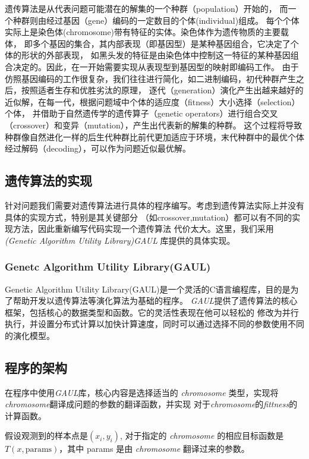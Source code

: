 \documentclass[a4paper]{article}
\begin{document}
遗传算法是从代表问题可能潜在的解集的一个种群（population）开始的，
而一个种群则由经过基因（gene）编码的一定数目的个体(individual)组成。
每个个体实际上是染色体(chromosome)带有特征的实体。染色体作为遗传物质的主要载体，
即多个基因的集合，其内部表现（即基因型）是某种基因组合，它决定了个体的形状的外部表现，
如黑头发的特征是由染色体中控制这一特征的某种基因组合决定的。因此，在一开始需要实现从表现型到基因型的映射即编码工作。
由于仿照基因编码的工作很复杂，我们往往进行简化，如二进制编码，初代种群产生之后，按照适者生存和优胜劣汰的原理，
逐代（generation）演化产生出越来越好的近似解，在每一代，根据问题域中个体的适应度（fitness）大小选择（selection）个体，
并借助于自然遗传学的遗传算子（genetic operators）进行组合交叉（crossover）和变异（mutation），产生出代表新的解集的种群。
这个过程将导致种群像自然进化一样的后生代种群比前代更加适应于环境，末代种群中的最优个体经过解码（decoding），可以作为问题近似最优解。

\subsection{遗传算法的实现}

针对问题我们需要对遗传算法进行具体的程序编写。考虑到遗传算法实际上并没有具体的实现方式，特别是其关键部分
（如crossover,mutation）都可以有不同的实现方法，因此重新编写代码实现一个遗传算法
代价太大。这里，我们采用 \emph{(Genetic Algorithm Utility Library)GAUL} 库提供的具体实现。

\subsubsection{Genetc Algorithm Utility Library(GAUL)}
Genetic Algorithm Utility
Library(GAUL)是一个灵活的C语言编程库，目的是为了帮助开发以遗传算法等演化算法为基础的程序。
\emph{GAUL}提供了遗传算法的核心框架，包括核心的数据类型和函数。它的灵活性表现在他可以轻松的
修改为并行执行，并设置分布式计算以加快计算速度，同时可以通过选择不同的参数使用不同的演化模型。

\subsection{程序的架构}
在程序中使用\emph{GAUL}库，核心内容是选择适当的 \emph{chromosome}
类型，实现将\emph{chromosome}翻译成问题的参数的翻译函数，并实现
对于\emph{chromosome}的\emph{fittness}的计算函数。

假设观测到的样本点是$(x_i, y_i)$,
对于指定的 \emph{chromosome} 的相应目标函数是$T(x,
\text{params})$，其中
params 是由 \emph{chromosome} 翻译过来的参数。
\end{document}
